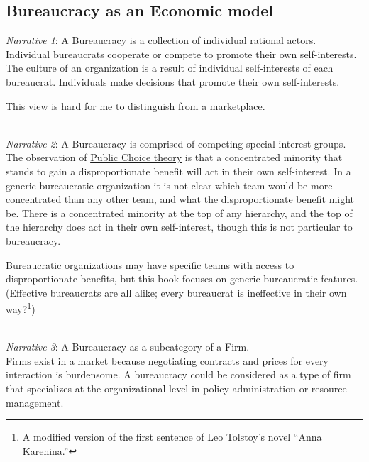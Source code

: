 
\subsection*{Bureaucracy as an Economic model}

\textit{Narrative 1}: A Bureaucracy is a collection of individual rational actors. \\
Individual bureaucrats cooperate or compete to promote their own self-interests.
The culture of an organization is a result of individual self-interests of each bureaucrat.
Individuals make decisions that promote their own self-interests.

This view is hard for me to distinguish from a marketplace. 

\ \\

\textit{Narrative 2}: A Bureaucracy is comprised of competing special-interest groups. \\
The observation of \href{https://en.wikipedia.org/wiki/Public_choice}{Public Choice theory} is that a concentrated minority that stands to gain a disproportionate benefit will act in their own self-interest. In a generic bureaucratic organization it is not clear which team would be more concentrated than any other team, and what the disproportionate benefit might be. There is a concentrated minority at the top of any hierarchy, and the top of the hierarchy does act in their own self-interest, though this is not particular to bureaucracy.

Bureaucratic organizations may have specific teams with access to disproportionate benefits, but this book focuses on generic bureaucratic features. (Effective bureaucrats are all alike; every bureaucrat is ineffective in their own way?\footnote{A modified version of the first sentence of Leo Tolstoy's novel ``Anna Karenina.''})


\ \\

\textit{Narrative 3}: A Bureaucracy as a subcategory of a Firm. \\
Firms exist in a market because negotiating contracts and prices for every interaction is burdensome. 
A bureaucracy could be considered as a type of firm that specializes at the organizational level in policy administration or resource management. 


